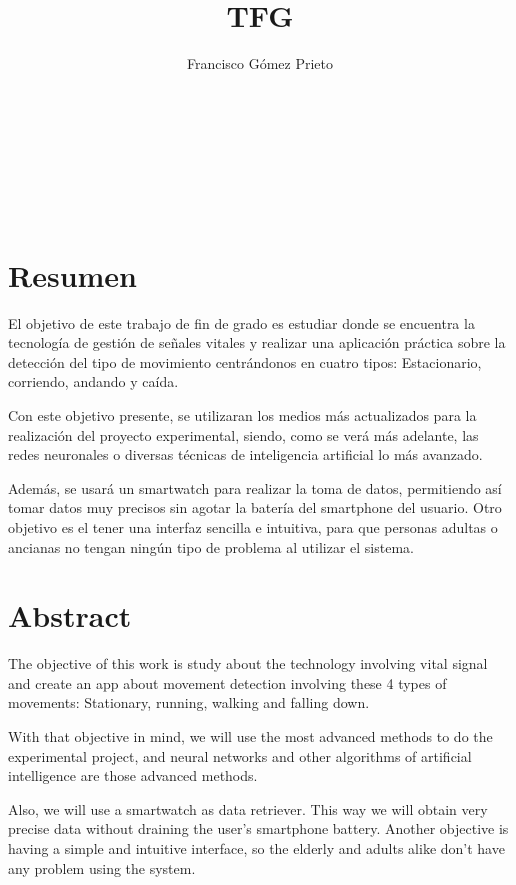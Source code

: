 \documentclass[12pt]{article}
\title{TFG}
\author{Francisco Gómez Prieto}
\date{}
\numberwithin{equation}{section}
\begin{document}
\pagestyle{empty}
\lstset{language=Java}


\newpage
~

\newpage
~
\newpage
~
\newpage
\setcounter{page}{1}
\pagestyle{plain}
\tableofcontents

\newpage
~

\newpage
\section*{Resumen}
El objetivo de este trabajo de fin de grado es estudiar donde se encuentra la tecnología de gestión de señales vitales y realizar una aplicación práctica sobre la detección del tipo de movimiento centrándonos en cuatro tipos: Estacionario, corriendo, andando y caída.

Con este objetivo presente, se utilizaran los medios más actualizados para la realización del proyecto experimental, siendo, como se verá más adelante, las redes neuronales o diversas técnicas de inteligencia artificial lo más avanzado. 

Además, se usará un smartwatch para realizar la toma de datos, permitiendo así tomar datos muy precisos sin agotar la batería del smartphone del usuario. Otro objetivo es el tener una interfaz sencilla e intuitiva, para que personas adultas o ancianas no tengan ningún tipo de problema al utilizar el sistema.


\newpage
\section*{Abstract}


The objective of this work is study about the technology involving vital signal and create an app about movement detection involving these 4 types of movements: Stationary, running, walking and falling down.

With that objective in mind, we will use the most advanced methods to do the experimental project, and neural networks and other algorithms of artificial intelligence are those advanced methods.

Also, we will use a smartwatch as data retriever. This way we will obtain very precise data without draining the user's smartphone battery. Another objective is having a simple and intuitive interface, so the elderly and adults alike don't have any problem using the system.

\newpage
\end{document}
